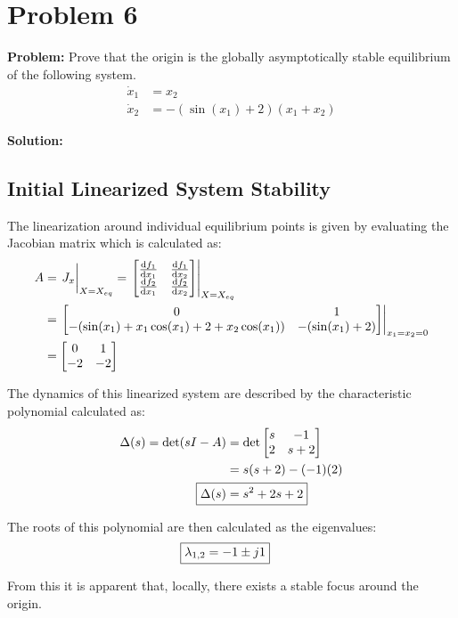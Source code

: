 \documentclass[letter]{article}
\numberwithin{equation}{section}
\begin{document}
\newpage
\section{Problem 6}
\textbf{Problem:}
Prove that the origin is the globally asymptotically stable equilibrium of the following system.
\begin{equation}
	\begin{aligned}
		\dot{x}_1 &= x_2\\
		\dot{x}_2 &= -(\sin(x_1) + 2)(x_1 + x_2)
	\end{aligned}
\end{equation}

\noindent
\textbf{Solution:}
\subsection{Initial Linearized System Stability}
The linearization around individual equilibrium points is given by evaluating the Jacobian matrix which is calculated as:
\begin{align}
	A &= \eval{J_x}_{X = X_{eq}}
	= \eval{\mqty[\dv{f_1}{x_1}&\dv{f_1}{x_2}\\\dv{f_2}{x_1}&\dv{f_2}{x_2}]}_{X=X_{eq}}\\
	&= \eval{\mqty[0 & 1\\
		-(\sin(x_1) + x_1 \cos(x_1) + 2 + x_2 \cos(x_1)) & -(\sin(x_1) + 2)
		]}_{x_1 = x_2 = 0}\\
	&= \mqty[0&1\\-2 &-2]
\end{align}

The dynamics of this linearized system are described by the characteristic polynomial calculated as:
\begin{align}
	\Delta(s) = \det(sI - A)
	&= \det\mqty[s &-1\\ 2 &s+2]\\
	&= s(s+2) - (-1) (2)\\
	\Aboxed{\Delta(s) &= s^2 + 2s + 2}
\end{align}

The roots of this polynomial are then calculated as the eigenvalues:
\begin{align}
	\Aboxed{\lambda_{1,2} &= -1 \pm j 1}
\end{align}

From this it is apparent that, locally, there exists a stable focus around the origin.

\newpage
\end{document}
